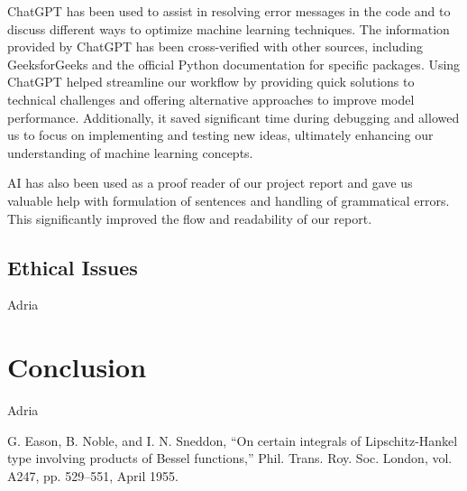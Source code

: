 \documentclass[conference]{IEEEtran}
\begin{document}
ChatGPT has been used to assist in resolving error messages in the code and to discuss different ways to optimize machine learning techniques. The information provided by ChatGPT has been cross-verified with other sources, including GeeksforGeeks and the official Python documentation for specific packages. Using ChatGPT helped streamline our workflow by providing quick solutions to technical challenges and offering alternative approaches to improve model performance. Additionally, it saved significant time during debugging and allowed us to focus on implementing and testing new ideas, ultimately enhancing our understanding of machine learning concepts.

AI has also been used as a proof reader of our project report and gave us valuable help with formulation of sentences and handling of grammatical errors. This significantly improved the flow and readability of our report. 

\subsection{Ethical Issues}
Adria



\section*{Conclusion}
Adria

\begin{thebibliography}{00}
 G. Eason, B. Noble, and I. N. Sneddon, ``On certain integrals of Lipschitz-Hankel type involving products of Bessel functions,'' Phil. Trans. Roy. Soc. London, vol. A247, pp. 529--551, April 1955.

\end{thebibliography}
\end{document}
